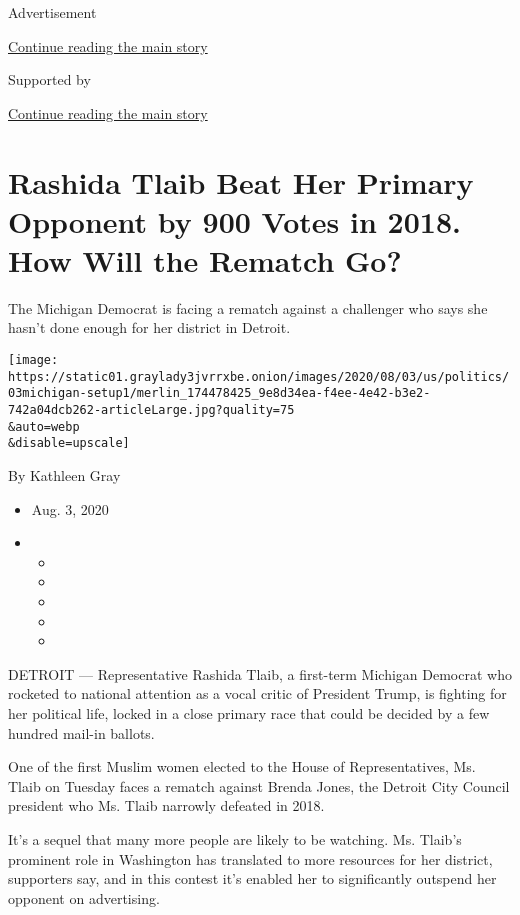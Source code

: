 Advertisement

\protect\hyperlink{after-top}{Continue reading the main story}

Supported by

\protect\hyperlink{after-sponsor}{Continue reading the main story}

\hypertarget{rashida-tlaib-beat-her-primary-opponent-by-900-votes-in-2018-how-will-the-rematch-go}{%
\section{Rashida Tlaib Beat Her Primary Opponent by 900 Votes in 2018.
How Will the Rematch
Go?}\label{rashida-tlaib-beat-her-primary-opponent-by-900-votes-in-2018-how-will-the-rematch-go}}

The Michigan Democrat is facing a rematch against a challenger who says
she hasn't done enough for her district in Detroit.

\texttt{[image: https://static01.graylady3jvrrxbe.onion/images/2020/08/03/us/politics/03michigan-setup1/merlin\_174478425\_9e8d34ea-f4ee-4e42-b3e2-742a04dcb262-articleLarge.jpg?quality=75\\\&auto=webp\\\&disable=upscale]}

By Kathleen Gray

\begin{itemize}
\item
  Aug. 3, 2020
\item
  \begin{itemize}
  \item
  \item
  \item
  \item
  \item
  \end{itemize}
\end{itemize}

DETROIT --- Representative Rashida Tlaib, a first-term Michigan Democrat
who rocketed to national attention as a vocal critic of President Trump,
is fighting for her political life, locked in a close primary race that
could be decided by a few hundred mail-in ballots.

One of the first Muslim women elected to the House of Representatives,
Ms. Tlaib on Tuesday faces a rematch against Brenda Jones, the Detroit
City Council president who Ms. Tlaib narrowly defeated in 2018.

It's a sequel that many more people are likely to be watching. Ms.
Tlaib's prominent role in Washington has translated to more resources
for her district, supporters say, and in this contest it's enabled her
to significantly outspend her opponent on advertising.

